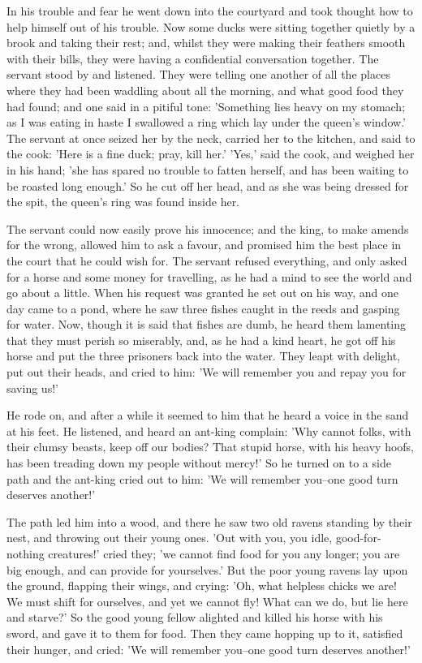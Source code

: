 \documentclass[12pt]{book}
\begin{document}
In his trouble and fear he went down into the courtyard and took
thought how to help himself out of his trouble. Now some ducks were
sitting together quietly by a brook and taking their rest; and, whilst
they were making their feathers smooth with their bills, they were
having a confidential conversation together. The servant stood by and
listened. They were telling one another of all the places where they
had been waddling about all the morning, and what good food they had
found; and one said in a pitiful tone: 'Something lies heavy on my
stomach; as I was eating in haste I swallowed a ring which lay under
the queen's window.' The servant at once seized her by the neck,
carried her to the kitchen, and said to the cook: 'Here is a fine
duck; pray, kill her.' 'Yes,' said the cook, and weighed her in his
hand; 'she has spared no trouble to fatten herself, and has been
waiting to be roasted long enough.' So he cut off her head, and as she
was being dressed for the spit, the queen's ring was found inside her.

The servant could now easily prove his innocence; and the king, to
make amends for the wrong, allowed him to ask a favour, and promised
him the best place in the court that he could wish for. The servant
refused everything, and only asked for a horse and some money for
travelling, as he had a mind to see the world and go about a little.
When his request was granted he set out on his way, and one day came
to a pond, where he saw three fishes caught in the reeds and gasping
for water. Now, though it is said that fishes are dumb, he heard them
lamenting that they must perish so miserably, and, as he had a kind
heart, he got off his horse and put the three prisoners back into the
water. They leapt with delight, put out their heads, and cried to him:
'We will remember you and repay you for saving us!'

He rode on, and after a while it seemed to him that he heard a voice
in the sand at his feet. He listened, and heard an ant-king complain:
'Why cannot folks, with their clumsy beasts, keep off our bodies? That
stupid horse, with his heavy hoofs, has been treading down my people
without mercy!' So he turned on to a side path and the ant-king cried
out to him: 'We will remember you--one good turn deserves another!'

The path led him into a wood, and there he saw two old ravens standing
by their nest, and throwing out their young ones. 'Out with you, you
idle, good-for-nothing creatures!' cried they; 'we cannot find food
for you any longer; you are big enough, and can provide for
yourselves.' But the poor young ravens lay upon the ground, flapping
their wings, and crying: 'Oh, what helpless chicks we are! We must
shift for ourselves, and yet we cannot fly! What can we do, but lie
here and starve?' So the good young fellow alighted and killed his
horse with his sword, and gave it to them for food. Then they came
hopping up to it, satisfied their hunger, and cried: 'We will remember
you--one good turn deserves another!'
\end{document}
